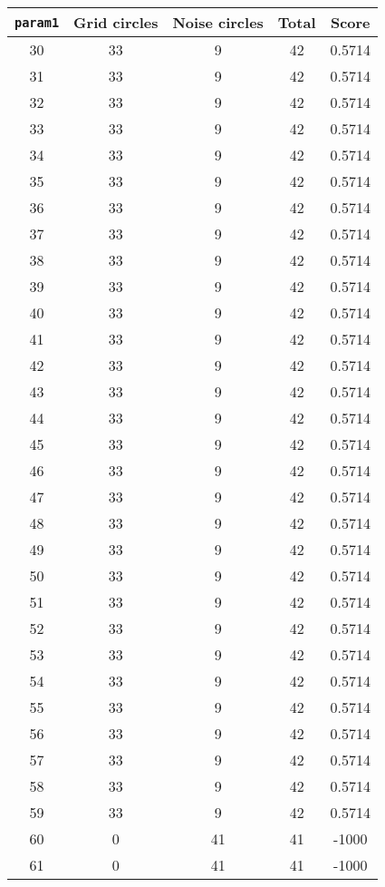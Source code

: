 \documentclass[letterpaper, 12pt]{article}
\begin{document}
\begin{longtable}{|c|c|c|c|c|}
\hline
\textbf{\texttt{param1}} & \textbf{Grid circles} & \textbf{Noise circles} & \textbf{Total} & \textbf{Score} \\
\hline
30 & 33 & 9 & 42 & 0.5714 \\
\hline
31 & 33 & 9 & 42 & 0.5714 \\
\hline
32 & 33 & 9 & 42 & 0.5714 \\
\hline
33 & 33 & 9 & 42 & 0.5714 \\
\hline
34 & 33 & 9 & 42 & 0.5714 \\
\hline
35 & 33 & 9 & 42 & 0.5714 \\
\hline
36 & 33 & 9 & 42 & 0.5714 \\
\hline
37 & 33 & 9 & 42 & 0.5714 \\
\hline
38 & 33 & 9 & 42 & 0.5714 \\
\hline
39 & 33 & 9 & 42 & 0.5714 \\
\hline
40 & 33 & 9 & 42 & 0.5714 \\
\hline
41 & 33 & 9 & 42 & 0.5714 \\
\hline
42 & 33 & 9 & 42 & 0.5714 \\
\hline
43 & 33 & 9 & 42 & 0.5714 \\
\hline
44 & 33 & 9 & 42 & 0.5714 \\
\hline
45 & 33 & 9 & 42 & 0.5714 \\
\hline
46 & 33 & 9 & 42 & 0.5714 \\
\hline
47 & 33 & 9 & 42 & 0.5714 \\
\hline
48 & 33 & 9 & 42 & 0.5714 \\
\hline
49 & 33 & 9 & 42 & 0.5714 \\
\hline
50 & 33 & 9 & 42 & 0.5714 \\
\hline
51 & 33 & 9 & 42 & 0.5714 \\
\hline
52 & 33 & 9 & 42 & 0.5714 \\
\hline
53 & 33 & 9 & 42 & 0.5714 \\
\hline
54 & 33 & 9 & 42 & 0.5714 \\
\hline
55 & 33 & 9 & 42 & 0.5714 \\
\hline
56 & 33 & 9 & 42 & 0.5714 \\
\hline
57 & 33 & 9 & 42 & 0.5714 \\
\hline
58 & 33 & 9 & 42 & 0.5714 \\
\hline
59 & 33 & 9 & 42 & 0.5714 \\
\hline
60 & 0 & 41 & 41 & -1000 \\
\hline
61 & 0 & 41 & 41 & -1000 \\

\end{longtable}
\end{document}
